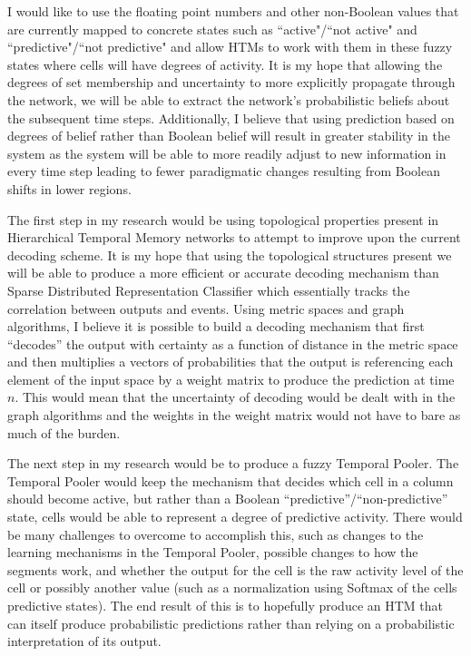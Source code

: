 \documentclass[fleqn,notitlepage,minimal]{article}
\begin{document}
	I would like to use the floating point numbers and other non-Boolean values that are currently mapped to concrete states such as ``active"/``not active" and ``predictive"/``not predictive" and allow HTMs to work with them in these fuzzy states where cells will have degrees of activity. It is my hope that allowing the degrees of set membership and uncertainty to more explicitly propagate through the network, we will be able to extract the network's probabilistic beliefs about the subsequent time steps. Additionally, I believe that using prediction based on degrees of belief rather than Boolean belief will result in greater stability in the system as the system will be able to more readily adjust to new information in every time step leading to fewer paradigmatic changes resulting from Boolean shifts in lower regions.
	
	The first step in my research would be using topological properties present in Hierarchical Temporal Memory networks to attempt to improve upon the current decoding scheme. It is my hope that using the topological structures present we will be able to produce a more efficient or accurate decoding mechanism than Sparse Distributed Representation Classifier which essentially tracks the correlation between outputs and events. Using metric spaces and graph algorithms, I believe it is possible to build a decoding mechanism that first ``decodes'' the output with certainty as a function of distance in the metric space and then multiplies a vectors of probabilities that the output is referencing each element of the input space by a weight matrix to produce the prediction at time $n$. This would mean that the uncertainty of decoding would be dealt with in the graph algorithms and the weights in the weight matrix would not have to bare as much of the burden.
	
	The next step in my research would be to produce a fuzzy Temporal Pooler. The Temporal Pooler would keep the mechanism that decides which cell in a column should become active, but rather than a Boolean ``predictive''/``non-predictive'' state, cells would be able to represent a degree of predictive activity. There would be many challenges to overcome to accomplish this, such as changes to the learning mechanisms in the Temporal Pooler, possible changes to how the segments work, and whether the output for the cell is the raw activity level of the cell or possibly another value (such as a normalization using Softmax of the cells predictive states). The end result of this is to hopefully produce an HTM that can itself produce probabilistic predictions rather than relying on a probabilistic interpretation of its output.
	
\end{document}
